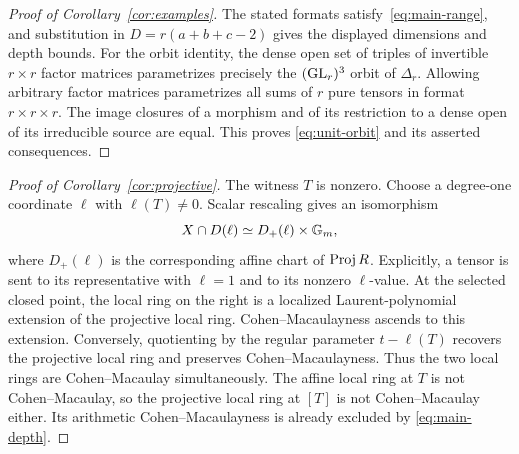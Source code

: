 \begin{proof}[Proof of Corollary~\ref{cor:examples}]
The stated formats satisfy~\eqref{eq:main-range}, and substitution
in $D=r(a+b+c-2)$ gives the displayed dimensions and depth bounds.
For the orbit identity, the dense open set of triples of invertible
$r\times r$ factor matrices parametrizes precisely the
$(\operatorname{GL}_r)^3$ orbit of $\Delta_r$. Allowing arbitrary factor matrices
parametrizes all sums of $r$ pure tensors in format $r\times r\times r$.
The image closures of a morphism and of its restriction to a dense
open of its irreducible source are equal. This proves
\eqref{eq:unit-orbit} and its asserted consequences.
\end{proof}

\begin{proof}[Proof of Corollary~\ref{cor:projective}]
The witness $T$ is nonzero. Choose a degree-one coordinate $\ell$
with $\ell(T)\ne0$. Scalar rescaling gives an isomorphism
\[
 X\cap D(\ell)\simeq D_+(\ell)\times\mathbb G_m,
\]
where $D_+(\ell)$ is the corresponding affine chart of
$\operatorname{Proj} R$. Explicitly, a tensor is sent to its representative with
$\ell=1$ and to its nonzero $\ell$-value.
At the selected closed point, the local ring on the right is a
localized Laurent-polynomial extension of the projective local
ring. Cohen--Macaulayness ascends to this extension. Conversely,
quotienting by the regular parameter $t-\ell(T)$ recovers the
projective local ring and preserves Cohen--Macaulayness.
Thus the two local rings are Cohen--Macaulay simultaneously.
The affine local ring at $T$ is not Cohen--Macaulay, so the
projective local ring at $[T]$ is not Cohen--Macaulay either.
Its arithmetic Cohen--Macaulayness is already excluded by
\eqref{eq:main-depth}.
\end{proof}
